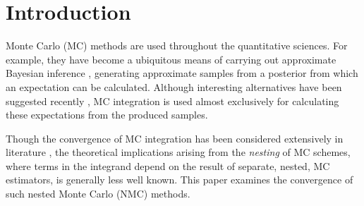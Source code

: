 
\section{Introduction}
\label{sec:intro}


Monte Carlo (MC) methods \citep{metropolis1949monte,robert2004monte} are used throughout the quantitative sciences.
For example, they have become a ubiquitous means of carrying out approximate Bayesian inference \citep{doucet2001introduction,gilks1995markov}, generating approximate samples from a posterior from which an expectation can be calculated.
Although interesting alternatives have been suggested recently \citep{briol2015probabilistic}, MC integration is used almost exclusively for calculating these expectations from the produced samples.

Though the convergence of MC integration has been considered extensively in 
literature \citep{gilks2005markov,robert2004monte}, the theoretical implications
arising from the \emph{nesting} of MC schemes, where terms in the integrand depend on the
result of separate, nested, MC estimators, is generally less well known.
This paper examines the convergence of such nested Monte Carlo (NMC) methods.  

